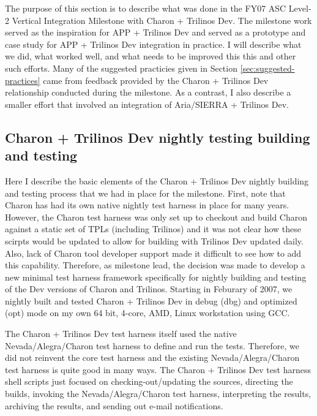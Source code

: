 \documentclass[pdf,ps2pdf,11pt]{SANDreport}
\begin{document}
The purpose of this section is to describe what was done in the FY07 ASC
Level-2 Vertical Integration Milestone with Charon + Trilinos Dev.  The
milestone work served as the inspiration for APP + Trilinos Dev and served as
a prototype and case study for APP + Trilinos Dev integration in practice.  I
will describe what we did, what worked well, and what needs to be improved
this this and other such efforts.  Many of the suggested practicies given in
Section {}\ref{sec:suggested-practices} came from feedback provided by the
Charon + Trilinos Dev relationship conducted during the milestone.  As a
contrast, I also describe a smaller effort that involved an integration of
Aria/SIERRA + Trilinos Dev.


%
\subsection{Charon + Trilinos Dev nightly testing building and testing}
%

Here I describe the basic elements of the Charon + Trilinos Dev nightly
building and testing process that we had in place for the milestone.  First,
note that Charon has had its own native nightly test harness in place for many
years.  However, the Charon test harness was only set up to checkout and build
Charon against a static set of TPLs (including Trilinos) and it was not clear
how these scirpts would be updated to allow for building with Trilinos Dev
updated daily.  Also, lack of Charon tool developer support made it difficult
to see how to add this capability.  Therefore, as milestone lead, the decision
was made to develop a new minimal test harness framework specifically for
nightly building and testing of the Dev versions of Charon and Trilinos.
Starting in Feburary of 2007, we nightly built and tested Charon + Trilinos
Dev in debug (dbg) and optimized (opt) mode on my own 64 bit, 4-core, AMD,
Linux workstation using GCC.

The Charon + Trilinos Dev test harness itself used the native
Nevada/Alegra/Charon test harness to define and run the tests.  Therefore, we
did not reinvent the core test harness and the existing Nevada/Alegra/Charon
test harness is quite good in many ways.  The Charon + Trilinos Dev test
harness shell scripts just focused on checking-out/updating the sources,
directing the builds, invoking the Nevada/Alegra/Charon test harness,
interpreting the results, archiving the results, and sending out e-mail
notifications.
\end{document}
